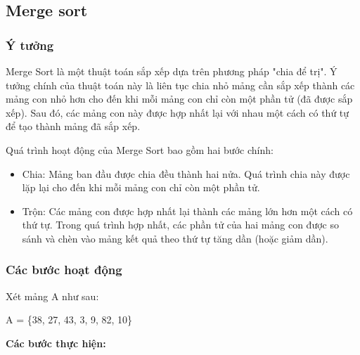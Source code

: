 \subsection{Merge sort}

\subsubsection{Ý tưởng}
Merge Sort là một thuật toán sắp xếp dựa trên phương pháp "chia để trị". Ý tưởng chính của thuật toán này là liên tục chia nhỏ mảng cần sắp xếp thành các mảng con nhỏ hơn cho đến khi mỗi mảng con chỉ còn một phần tử (đã được sắp xếp). Sau đó, các mảng con này được hợp nhất lại với nhau một cách có thứ tự để tạo thành mảng đã sắp xếp.

Quá trình hoạt động của Merge Sort bao gồm hai bước chính:
\begin{itemize}
    \item Chia: Mảng ban đầu được chia đều thành hai nửa. Quá trình chia này được lặp lại cho đến khi mỗi mảng con chỉ còn một phần tử.
    \item Trộn: Các mảng con được hợp nhất lại thành các mảng lớn hơn một cách có thứ tự. Trong quá trình hợp nhất, các phần tử của hai mảng con được so sánh và chèn vào mảng kết quả theo thứ tự tăng dần (hoặc giảm dần).
\end{itemize}
    
\subsubsection{Các bước hoạt động}
Xét mảng A như sau: 
\begin{center}
   A = \{38, 27, 43, 3, 9, 82, 10\} 
\end{center} 

\textbf{Các bước thực hiện:}

